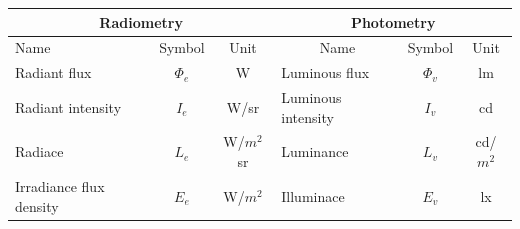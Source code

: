 \begin{table}[ht]
	\centering
	\begin{tabular}{ |p{4cm} p{2cm} p{2cm}|p{4cm} p{2cm} p{2cm}|  }
		\hline
		\multicolumn{3}{|c}{Radiometry}&\multicolumn{3}{|c|}{Photometry} \\
		\hline\hline
		\multicolumn{1}{|l}{Name}			& \multicolumn{1}{c}{Symbol}& \multicolumn{1}{c|}{Unit}	& \multicolumn{1}{c}{Name}	& \multicolumn{1}{c}{Symbol}	& \multicolumn{1}{c|}{Unit}\\
		\hline
		Radiant flux			& \multicolumn{1}{|c|}{$\Phi_e$}&  \multicolumn{1}{|c|}{W}		& Luminous flux		& \multicolumn{1}{|c|}{$\Phi_v$}	&  \multicolumn{1}{|c|}{lm}\\
		Radiant intensity		& \multicolumn{1}{|c|}{$I_e$}	&  \multicolumn{1}{|c|}{W/sr}	&Luminous intensity 	& \multicolumn{1}{|c|}{$I_v$} 		&  \multicolumn{1}{|c|}{cd}\\
		Radiace					& \multicolumn{1}{|c|}{$L_e$}	&  \multicolumn{1}{|c|}{W/$m^2$sr}		&Luminance			& \multicolumn{1}{|c|}{$L_v$}		&  \multicolumn{1}{|c|}{cd/$m^2$}\\
		Irradiance flux density	& \multicolumn{1}{|c|}{$E_e$}	&  \multicolumn{1}{|c|}{W/$m^2$}		&Illuminace 			& \multicolumn{1}{|c|}{$E_v$} 		&  \multicolumn{1}{|c|}{lx}\\
		
		\hline
	\end{tabular}
\end{table}